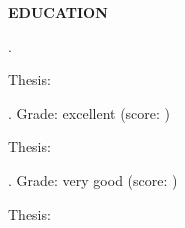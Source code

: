 


\vspace{\spaceSection}
\begin{center}
    \textbf{EDUCATION}
\end{center}
\vspace{\spaceSection}

\textbf{\PhDUniversity} \hfill \PhDLocation

\PhDFaculty \hfill \PhDDate

\textbf{\PhDTitle}.

Thesis: \PhDThesis 

\PhDGrant

\vspace{\spaceSection}

\textbf{\MScUniversity} \hfill \MScLocation

\MScFaculty \hfill	\MScDate

\textbf{\MScTitle}. Grade: excellent (score: \MScScore)

Thesis: \MScThesis

\MScNotes

\vspace{\spaceSection}

\textbf{\BScUniversity} \hfill \BScLocation

\BScFaculty \hfill \BScDate

\textbf{\BScTitle}. Grade: very good (score: \BScScore)

Thesis: \BScThesis